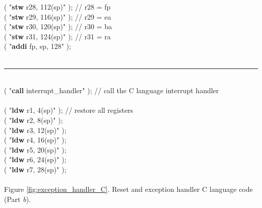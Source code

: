 \begin{center}
\begin{minipage}[t]{12.5 cm}
\begin{tabbing}
 ( "{\bf stw} \>r28, 112(sp)" ); \>// r28 = fp\\
 ( "{\bf stw} \>r29, 116(sp)" ); \>// r29 = ea\\
 ( "{\bf stw} \>r30, 120(sp)" ); \>// r30 = ba\\
 ( "{\bf stw} \>r31, 124(sp)" ); \>// r31 = ra\\
 ( "{\bf addi} \>fp,  sp, 128" );\\
~\rule{6.0in}{0in}~\\
 ( "{\bf call} \>interrupt\_handler" );		\>// call the C language interrupt handler\\
~\\
 ( "{\bf ldw} \>r1,  4(sp)" );				\>// restore all registers\\
 ( "{\bf ldw} \>r2,  8(sp)" );\\
 ( "{\bf ldw} \>r3,  12(sp)" );\\
 ( "{\bf ldw} \>r4,  16(sp)" );\\
 ( "{\bf ldw} \>r5,  20(sp)" );\\
 ( "{\bf ldw} \>r6,  24(sp)" );\\
 ( "{\bf ldw} \>r7,  28(sp)" );\\
~\\
Figure \ref{fig:exception_handler_C}. Reset and exception handler C language code (Part {\it b}).
\end{tabbing}
\end{minipage}
\end{center}

